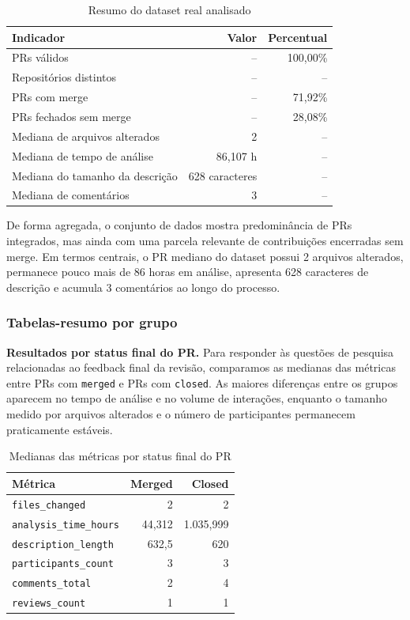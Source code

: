 \documentclass[12pt,a4paper]{article}
\begin{document}
\begin{table}[H]
\centering
\caption{Resumo do dataset real analisado}
\begin{tabular}{@{}lrr@{}}
\toprule
Indicador & Valor & Percentual \\ \midrule
PRs v\'alidos & -- & 100,00\% \\
Reposit\'orios distintos & -- & -- \\
PRs com merge & -- & 71,92\% \\
PRs fechados sem merge & -- & 28,08\% \\
Mediana de arquivos alterados & 2 & -- \\
Mediana de tempo de an\'alise & 86,107 h & -- \\
Mediana do tamanho da descri\c{c}\~ao & 628 caracteres & -- \\
Mediana de coment\'arios & 3 & -- \\ \bottomrule
\end{tabular}
\end{table}

De forma agregada, o conjunto de dados mostra predomin\^ancia de PRs integrados, mas ainda com uma parcela relevante de contribui\c{c}\~oes encerradas sem merge. Em termos centrais, o PR mediano do dataset possui 2 arquivos alterados, permanece pouco mais de 86 horas em an\'alise, apresenta 628 caracteres de descri\c{c}\~ao e acumula 3 coment\'arios ao longo do processo.

\subsubsection{Tabelas-resumo por grupo}
\textbf{Resultados por status final do PR.} Para responder \`as quest\~oes de pesquisa relacionadas ao feedback final da revis\~ao, comparamos as medianas das m\'etricas entre PRs com \texttt{merged} e PRs com \texttt{closed}. As maiores diferen\c{c}as entre os grupos aparecem no tempo de an\'alise e no volume de intera\c{c}\~oes, enquanto o tamanho medido por arquivos alterados e o n\'umero de participantes permanecem praticamente est\'aveis.

\begin{table}[H]
\centering
\caption{Medianas das m\'etricas por status final do PR}
\begin{tabular}{@{}lrr@{}}
\toprule
M\'etrica & Merged & Closed \\ \midrule
\texttt{files\_changed} & 2 & 2 \\
\texttt{analysis\_time\_hours} & 44,312 & 1.035,999 \\
\texttt{description\_length} & 632,5 & 620 \\
\texttt{participants\_count} & 3 & 3 \\
\texttt{comments\_total} & 2 & 4 \\
\texttt{reviews\_count} & 1 & 1 \\ \bottomrule
\end{tabular}
\end{table}
\end{document}
